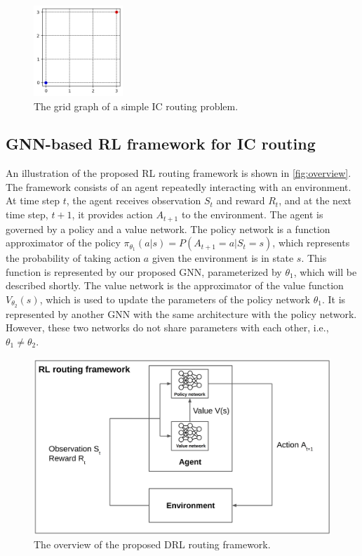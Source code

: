 \documentclass[letterpaper]{article}
\begin{document}
\begin{figure}[h!]
    \centering
    \includegraphics[width=0.3\textwidth]{figure/grid_grap.png}
    \caption{The grid graph of a simple IC routing problem.}
    \label{fig:grid}
\end{figure}

\subsection{GNN-based RL framework for IC routing}
An illustration of the proposed RL routing framework is shown in
\autoref{fig:overview}. The framework consists of an agent repeatedly
interacting with an environment. At time step $t$, the agent receives
observation $S_{t}$ and reward $R_{t}$, and at the next time step, $t+1$, it
provides action $A_{t+1}$ to the environment. The agent is governed by a policy
and a value network. The policy network is a function approximator of the policy
$\pi_{\theta_1}(a|s)=P(A_{t+1}=a|S_{t}=s)$, which represents the probability of
taking action $a$ given the environment is in state $s$. This function is
represented by our proposed GNN, parameterized by $\theta_1$, which will be
described shortly. The value network is the approximator of the value function
$V_{\theta_2}(s)$, which is used to update the parameters of the policy network
$\theta_1$. It is represented by another GNN with the same architecture with the
policy network. However, these two networks do not share parameters with each
other, i.e., $\theta_1\neq\theta_2$. 
\begin{figure}[h!]
    \centering
    \includegraphics[width=\textwidth]{figure/overview.png}
    \caption{The overview of the proposed DRL routing framework.}
    \label{fig:overview}
\end{figure}
\end{document}
